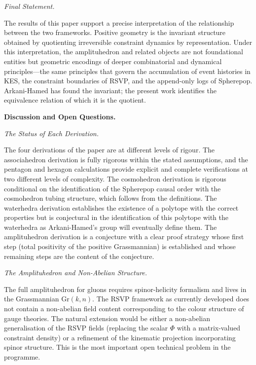 \documentclass[12pt, oneside]{amsart}
\theoremstyle{plain}
\theoremstyle{definition}
\theoremstyle{remark}
\newcommand{\Gr}{\mathrm{Gr}}
\newcommand{\Phif}{\Phi}
\begin{document}
\medskip\noindent\textit{Final Statement.}

The results of this paper support a precise interpretation of the relationship between the two frameworks. Positive geometry is the invariant structure obtained by quotienting irreversible constraint dynamics by representation. Under this interpretation, the amplituhedron and related objects are not foundational entities but geometric encodings of deeper combinatorial and dynamical principles---the same principles that govern the accumulation of event histories in KES, the constraint boundaries of RSVP, and the append-only logs of Spherepop. Arkani-Hamed has found the invariant; the present work identifies the equivalence relation of which it is the quotient.

\bigskip\noindent\textbf{Discussion and Open Questions.}
\label{sec:discussion}

\medskip\noindent\textit{The Status of Each Derivation.}

The four derivations of the paper are at different levels of rigour. The associahedron derivation is fully rigorous within the stated assumptions, and the pentagon and hexagon calculations provide explicit and complete verifications at two different levels of complexity. The cosmohedron derivation is rigorous conditional on the identification of the Spherepop causal order with the cosmohedron tubing structure, which follows from the definitions. The waterhedra derivation establishes the existence of a polytope with the correct properties but is conjectural in the identification of this polytope with the waterhedra as Arkani-Hamed's group will eventually define them. The amplituhedron derivation is a conjecture with a clear proof strategy whose first step (total positivity of the positive Grassmannian) is established and whose remaining steps are the content of the conjecture.

\medskip\noindent\textit{The Amplituhedron and Non-Abelian Structure.}

The full amplituhedron for gluons requires spinor-helicity formalism and lives in the Grassmannian $\Gr(k,n)$. The RSVP framework as currently developed does not contain a non-abelian field content corresponding to the colour structure of gauge theories. The natural extension would be either a non-abelian generalisation of the RSVP fields (replacing the scalar $\Phif$ with a matrix-valued constraint density) or a refinement of the kinematic projection incorporating spinor structure. This is the most important open technical problem in the programme.
\end{document}
